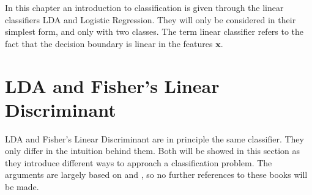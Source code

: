 %
In this chapter an introduction to classification is given through the linear classifiers LDA and Logistic Regression. They will only be considered in their simplest form, and only with two classes. The term linear classifier refers to the fact that the decision boundary is linear in the features $\mathbf{x}$.
%
\section{LDA and Fisher's Linear Discriminant}
\label{sec:LDA and Fisher's Linear Discriminant}
LDA and Fisher's Linear Discriminant are in principle the same classifier. They only differ in the intuition behind them. Both will be showed in this section as they introduce different ways to approach a classification problem. The arguments are largely based on \cite{bishop} and \cite{modstat}, so no further references to these books will be made. 


